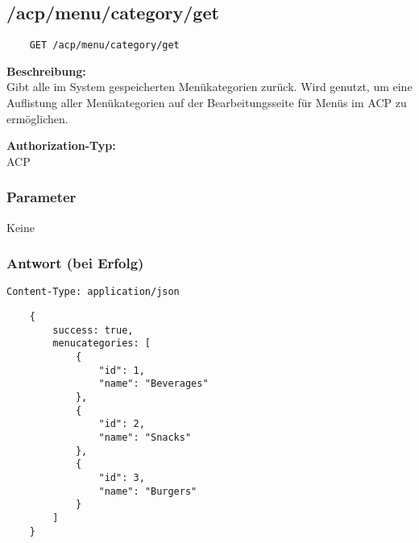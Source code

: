 \subsection{/acp/menu/category/get}

\begin{lstlisting}
    GET /acp/menu/category/get
\end{lstlisting}

\textbf{Beschreibung:} \\
Gibt alle im System gespeicherten Menükategorien zurück. Wird genutzt, um eine Auflistung aller Menükategorien auf der Bearbeitungsseite für Menüs im ACP zu ermöglichen.

\textbf{Authorization-Typ:} \\
ACP

\subsubsection{Parameter}
Keine

\subsubsection{Antwort (bei Erfolg)}

\lstinline{Content-Type: application/json}
\begin{lstlisting}
    {
        success: true, 
        menucategories: [
            {
                "id": 1,
                "name": "Beverages"
            },
            {
                "id": 2,
                "name": "Snacks"
            },
            {
                "id": 3,
                "name": "Burgers"
            }
        ]
    }
\end{lstlisting}
